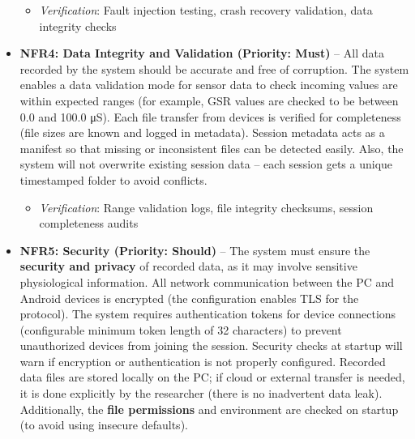 \documentclass[12pt,a4paper]{article}
\begin{document}
\begin{itemize}
  \begin{itemize}
  \tightlist
  \item
    \emph{Verification}: Fault injection testing, crash recovery validation, data integrity checks
  \end{itemize}
\item
  \textbf{NFR4: Data Integrity and Validation (Priority: Must)} -- All data recorded by the system should be accurate and free of corruption. The system enables a data validation mode for sensor data to check incoming values are within expected ranges (for example, GSR values are checked to be between 0.0 and 100.0 μS). Each file transfer from devices is verified for completeness (file sizes are known and logged in metadata). Session metadata acts as a manifest so that missing or inconsistent files can be detected easily. Also, the system will not overwrite existing session data -- each session gets a unique timestamped folder to avoid conflicts.

  \begin{itemize}
  \tightlist
  \item
    \emph{Verification}: Range validation logs, file integrity checksums, session completeness audits
  \end{itemize}
\item
  \textbf{NFR5: Security (Priority: Should)} -- The system must ensure the \textbf{security and privacy} of recorded data, as it may involve sensitive physiological information. All network communication between the PC and Android devices is encrypted (the configuration enables TLS for the protocol). The system requires authentication tokens for device connections (configurable minimum token length of 32 characters) to prevent unauthorized devices from joining the session. Security checks at startup will warn if encryption or authentication is not properly configured. Recorded data files are stored locally on the PC; if cloud or external transfer is needed, it is done explicitly by the researcher (there is no inadvertent data leak). Additionally, the \textbf{file permissions} and environment are checked on startup (to avoid using insecure defaults).


\end{itemize}
\end{document}
